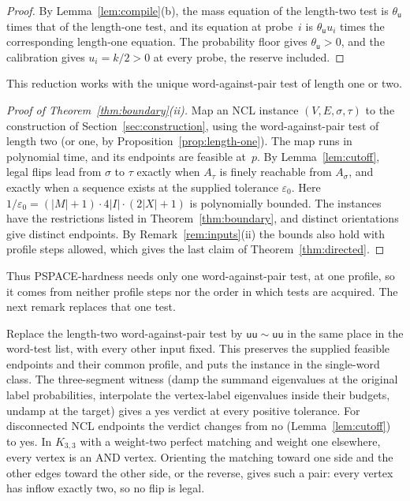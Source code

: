 \begin{proof}
By Lemma~\ref{lem:compile}(b), the mass equation of the length-two test is
$\theta_{\mathsf u}$ times that of the length-one test, and its equation at
probe~$i$ is $\theta_{\mathsf u}u_i$ times the corresponding length-one
equation. The probability floor gives $\theta_{\mathsf u}>0$, and the calibration gives
$u_i=k/2>0$ at every probe, the reserve included.
\end{proof}

This reduction works with the unique word-against-pair test of length one
or two.

\begin{proof}[Proof of Theorem~\ref{thm:boundary}(ii)]
Map an NCL instance $(V,E,\sigma,\tau)$ to the construction of
Section~\ref{sec:construction}, using the word-against-pair test of length
two (or one, by Proposition~\ref{prop:length-one}). The map runs in
polynomial time, and its endpoints are feasible at~$p$. By
Lemma~\ref{lem:cutoff}, legal flips lead from $\sigma$ to $\tau$ exactly
when $A_\tau$ is finely reachable from $A_\sigma$, and exactly when a
sequence exists at the supplied tolerance $\varepsilon_0$. Here
$1/\varepsilon_0=(|M|+1)\cdot4|I|\cdot(2|X|+1)$ is polynomially bounded.
The instances have the restrictions listed in Theorem~\ref{thm:boundary},
and distinct orientations give distinct endpoints. By Remark~\ref{rem:inputs}(ii) the bounds also hold
with profile steps allowed, which gives the last claim of
Theorem~\ref{thm:directed}.
\end{proof}

Thus PSPACE-hardness needs only one word-against-pair test, at one
profile, so it comes from neither profile steps nor the order in which
tests are acquired. The next remark replaces that one test.

\begin{remark}\label{rem:control}
Replace the length-two word-against-pair test by
$\mathsf{uu}\sim\mathsf{uu}$ in the same place in the word-test list, with
every other input fixed. This preserves the supplied feasible endpoints and their common profile,
and puts the instance in the single-word class. The three-segment witness
(damp the summand eigenvalues at the original label probabilities,
interpolate the vertex-label eigenvalues inside their budgets, undamp at
the target) gives a yes verdict at every positive tolerance. For
disconnected NCL endpoints the verdict changes from no
(Lemma~\ref{lem:cutoff}) to yes. In $K_{3,3}$ with a weight-two perfect
matching and weight one elsewhere, every vertex is an AND vertex. Orienting
the matching toward one side and the other edges toward the other side, or
the reverse, gives such a pair: every vertex has inflow exactly two, so no
flip is legal.
\end{remark}

